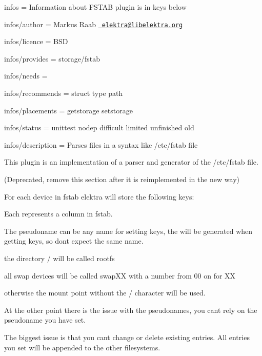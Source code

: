 
\begin{DoxyItemize}
\item infos = Information about F\+S\+T\+AB plugin is in keys below
\item infos/author = Markus Raab \href{mailto:elektra@libelektra.org}{\texttt{ elektra@libelektra.\+org}}
\item infos/licence = B\+SD
\item infos/provides = storage/fstab
\item infos/needs =
\item infos/recommends = struct type path
\item infos/placements = getstorage setstorage
\item infos/status = unittest nodep difficult limited unfinished old
\item infos/description = Parses files in a syntax like /etc/fstab file
\end{DoxyItemize}

This plugin is an implementation of a parser and generator of the /etc/fstab file.

(Deprecated, remove this section after it is reimplemented in the new way)

For each device in fstab elektra will store the following keys\+:


\begin{DoxyCode}{0}
\end{DoxyCode}


Each represents a column in fstab.

The pseudoname can be any name for setting keys, the will be generated when getting keys, so don\textquotesingle{}t expect the same name.

the directory {\ttfamily /} will be called {\ttfamily rootfs}

all swap devices will be called {\ttfamily swap\+XX} with a number from 00 on for XX

otherwise the mount point without the \textquotesingle{}/\textquotesingle{} character will be used.

At the other point there is the issue with the pseudonames, you can\textquotesingle{}t rely on the pseudoname you have set.

The biggest issue is that you can\textquotesingle{}t change or delete existing entries. All entries you set will be appended to the other filesystems.


